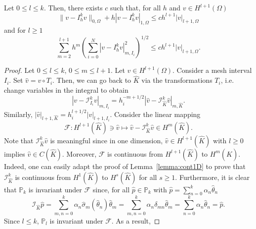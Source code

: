 \begin{lemma}\label{lemma:interpolationerrPk}
    Let $0 \le l \le k$. Then, there exists $c$ such that, for all $h$ and $v \in H^{l+1}(\Omega)$
    \begin{equation}
        \|v - I_h^k v\|_{0,\Omega} + h |v - I_h^k v|_{1,\Omega} \le c h^{l+1} |v|_{l+1,\Omega}
    \end{equation}
    and for $l \ge 1$
    \begin{equation}
        \sum_{m=2}^{l+1} h^m \left(\sum_{i=0}^N |v - I_h^k v|_{m,I_i}^2\right)^{1/2} \le c h^{l+1} |v|_{l+1,\Omega}.
    \end{equation}
    \begin{proof}
        Let $0 \le l \le k$, $0 \le m \le l+1$. Let $v \in H^{l+1}(\Omega)$.
        Consider a mesh interval $I_i$. Set $\hat{v} = v \circ T_i$. Then, we can go back to $\hat{K}$ via the transformations $T_i$, i.e. change variables in the integral to obtain
        \begin{equation*}
            |v - \mathcal{I}_{I_i}^k v|_{m,I_i} = h_i^{-m+1/2} |\hat{v} - \mathcal{I}_{\hat{K}}^k \hat{v}|_{m,\hat{K}}.
        \end{equation*}
        Similarly, $|\hat{v}|_{l+1,\hat{K}} = h_i^{l+1/2} |v|_{l+1,I_i}$. 
        Consider the linear mapping
        \begin{equation*}
            \mathcal{F}: H^{l+1}(\hat{K}) \ni \hat{v} \mapsto \hat{v} - \mathcal{I}_{\hat{K}}^k \hat{v} \in H^m(\hat{K}).
        \end{equation*}
        Note that $\mathcal{I}_{\hat{K}}^k \hat{v}$ is meaningful since in one dimension, $\hat{v} \in H^{l+1}(\hat{K})$ with $l \ge 0$ implies $\hat{v} \in C(\hat{K})$. Moreover, $\mathcal{F}$ is continuous from $H^{l+1}(\hat{K})$ to $H^m(\hat{K})$. Indeed, one can easily adapt the proof of Lemma~\ref{lemma:cont1D} to prove that $\mathcal{I}_{\hat{K}}^k$ is continuous from $H^1(\hat{K})$ to $H^s(\hat{K})$ for all $s \ge 1$. Furthermore, it is clear that $\mathbb{P}_k$ is invariant under $\mathcal{F}$ since, for all $\hat{p} \in \mathbb{P}_k$ with $\hat{p} = \sum_{n=0}^k \alpha_n \hat{\theta}_n$
        \begin{equation*}
            \mathcal{I}_{\hat{K}} \hat{p} = \sum_{m,n=0}^k \alpha_n \hat{\sigma}_m(\hat{\theta}_n) \hat{\theta}_m = \sum_{m,n=0}^k \alpha_n \delta_{mn} \hat{\theta}_m = \sum_{n=0}^k \alpha_n \hat{\theta}_n = \hat{p}.
        \end{equation*}
        Since $l \le k$, $\mathbb{P}_l$ is invariant under $\mathcal{F}$. As a result,

\end{proof}
\end{lemma}
